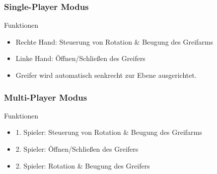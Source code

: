 \begin{frame}
\frametitle{Single-Player Modus}
\begin{block}{Funktionen}
\begin{itemize}
\item Rechte Hand: Steuerung von Rotation \& Beugung des Greifarms
\item Linke Hand: Öffnen/Schließen des Greifers
\item Greifer wird automatisch senkrecht zur Ebene ausgerichtet.
\end{itemize}
\end{block}

\end{frame}

\begin{frame}
\frametitle{Multi-Player Modus}
\begin{block}{Funktionen}
\begin{itemize}
\item 1. Spieler: Steuerung von Rotation \& Beugung des Greifarms
\item 2. Spieler: Öffnen/Schließen des Greifers
\item 2. Spieler: Rotation \& Beugung des Greifers
\end{itemize}
\end{block}
\end{frame}